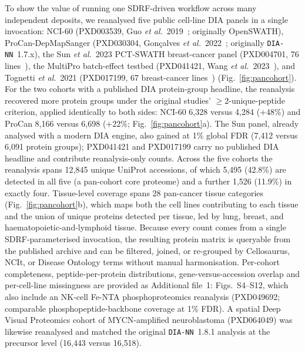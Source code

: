 To show the value of running one SDRF-driven workflow across many independent deposits, we reanalysed five public cell-line DIA panels in a single \quantmsdiann{} invocation: NCI-60 (PXD003539, Guo \textit{et al.}~2019~\cite{guo2019nci60}; originally OpenSWATH), ProCan-DepMapSanger (PXD030304, Gon\c{c}alves \textit{et al.}~2022~\cite{goncalves2022procan}; originally \texttt{DIA-NN}~1.7.x), the Sun \textit{et al.}~2023 PCT-SWATH breast-cancer panel (PXD004701, 76 lines~\cite{sun2023breast}), the MultiPro batch-effect testbed (PXD041421, Wang \textit{et al.}~2023~\cite{wang2023multipro}), and Tognetti \textit{et al.}~2021 (PXD017199, 67 breast-cancer lines~\cite{tognetti2021breast}) (Fig.~\ref{fig:pancohort}).
For the two cohorts with a published DIA protein-group headline, the reanalysis recovered more protein groups under the original studies' $\geq 2$-unique-peptide criterion, applied identically to both sides: NCI-60 6{,}328 versus 4{,}284 ($+48$\%) and ProCan 8{,}166 versus 6{,}698 ($+22$\%; Fig.~\ref{fig:pancohort}a). The Sun panel, already analysed with a modern DIA engine, also gained at 1\% global FDR (7{,}412 versus 6{,}091 protein groups); PXD041421 and PXD017199 carry no published DIA headline and contribute reanalysis-only counts.
Across the five cohorts the reanalysis spans 12{,}845 unique UniProt accessions, of which 5{,}495 (42.8\%) are detected in all five (a pan-cohort core proteome) and a further 1{,}526 (11.9\%) in exactly four.
Tissue-level coverage spans 28 pan-cancer tissue categories (Fig.~\ref{fig:pancohort}b), which maps both the cell lines contributing to each tissue and the union of unique proteins detected per tissue, led by lung, breast, and haematopoietic-and-lymphoid tissue.
Because every count comes from a single SDRF-parameterised \quantmsdiann{} invocation, the resulting protein matrix is queryable from the published \qpx{} archive and can be filtered, joined, or re-grouped by Cellosaurus, NCIt, or Disease Ontology terms without manual harmonisation.
Per-cohort completeness, peptide-per-protein distributions, gene-versus-accession overlap and per-cell-line missingness are provided as Additional file~1: Figs.~S4--S12, which also include an NK-cell Fe-NTA phosphoproteomics reanalysis (PXD049692; comparable phosphopeptide-backbone coverage at 1\% FDR). A spatial Deep Visual Proteomics cohort of MYCN-amplified neuroblastoma (PXD064049) was likewise reanalysed and matched the original \texttt{DIA-NN}~1.8.1 analysis at the precursor level (16{,}443 versus 16{,}518).

